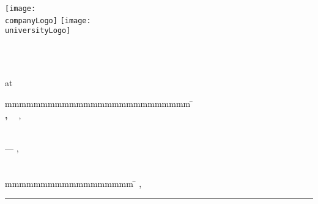 \begin{titlepage}
	\texttt{[image: \\companyLogo]}
	\hfill
	\texttt{[image: \\universityLogo]}
	\centering
	
	{\large \ \par}
	{\scshape\LARGE \reportType \par}	
	\vspace{1.5cm}
	{\huge\bfseries \thesisTitle \par}
	\vspace{1.5cm}
	{\large \courseOfStudies \\ at \university \par}
	\vspace{1cm}
	{\large \byTitle \par}
	{\Large\itshape \authorName \par}
	\vfill
	{\large \thesisDate \par}
	\vfill
	\begin{tabbing}
		mmmmmmmmmmmmmmmmmmmmmmmmmm			\= \kill 			%
		\textbf{\timeOfProjectTitle}			\> \timeOfProject \\
		\textbf{\studentIdTitle, \ \courseTitle}	\> \studentId, \ \course\\
		\textbf{\companyTitle}				\> \company \\
		\textbf{\supervisorTitle}			\> \supervisorName
	\end{tabbing}
\end{titlepage}

\cleardoublepage
\begin{titlepage}
	\noindent
	\begin{minipage}[c][\textheight][c]{\textwidth}
		\centering	
		\textbf{\textit{\quoteText}} \linebreak
		--- \textsc{\quoteAuthor}, \ \textit{\quoteSource}
	\end{minipage}
\end{titlepage}

\cleardoublepage
\chapter*{\declarationTitle}
\declaration
\vspace{4em}

\begin{tabbing}
	mmmmmmmmmmmmmmmmmm	\= \kill 	%
	\city, \ \signatureDate 	\> \rule{6cm}{0.4pt} \\
				\> \authorName
\end{tabbing}

\cleardoublepage
\begin{otherlanguage}{ngerman} 
\begin{abstract}
	\abstractGermanText
\end{abstract}
\end{otherlanguage}

\cleardoublepage
\begin{abstract}
	\abstractText
\end{abstract}
\cleardoublepage
